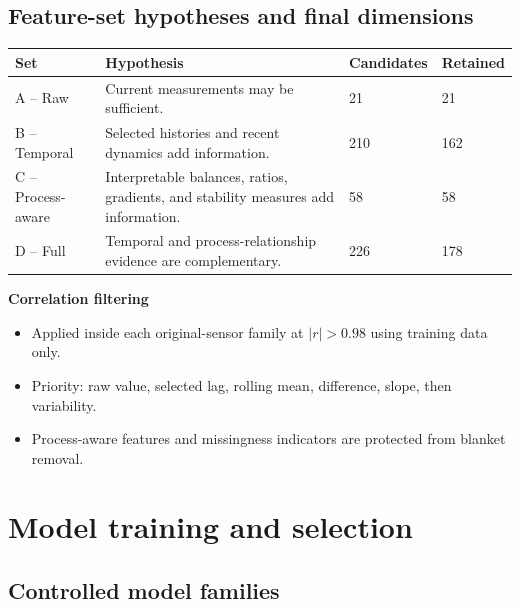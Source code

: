 \documentclass[10pt,a4paper]{article}
\begin{document}
\subsection*{Feature-set hypotheses and final dimensions}

\begin{tabularx}{\textwidth}{L{0.15\textwidth}Y L{0.16\textwidth}L{0.14\textwidth}}
\toprule
\textbf{Set} & \textbf{Hypothesis} & \textbf{Candidates} & \textbf{Retained} \\
\midrule
A -- Raw & Current measurements may be sufficient. & 21 & 21 \\
B -- Temporal & Selected histories and recent dynamics add information. & 210 & 162 \\
C -- Process-aware & Interpretable balances, ratios, gradients, and stability measures add information. & 58 & 58 \\
D -- Full & Temporal and process-relationship evidence are complementary. & 226 & 178 \\
\bottomrule
\end{tabularx}

\textbf{Correlation filtering}
\begin{itemize}
  \item Applied inside each original-sensor family at $|r|>0.98$ using training data only.
  \item Priority: raw value, selected lag, rolling mean, difference, slope, then variability.
  \item Process-aware features and missingness indicators are protected from blanket removal.
\end{itemize}

\section{Model training and selection}

\subsection*{Controlled model families}
\end{document}
